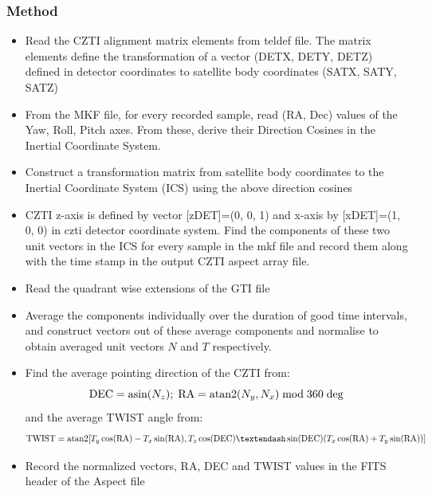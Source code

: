 \documentclass[11pt,oneside,a4paper]{article}
\begin{document}
\subsubsection*{Method}
\begin{itemize}
\item{Read  the  CZTI  alignment  matrix  elements  from  teldef  file. The  matrix  elements  define  the  
transformation  of  a  vector  (DETX,  DETY,  DETZ)  defined  in  detector  coordinates  to  satellite  
body  coordinates  (SATX,  SATY,  SATZ) }

\item{From  the  MKF  file,  for  every  recorded  sample,  
read  (RA,  Dec)  values  of  the  Yaw,  Roll, Pitch  axes.  
From  these,  derive  their  Direction  Cosines  in  the  Inertial  Coordinate  System.}

\item{Construct  
a  transformation  matrix  from  satellite  body  coordinates  to  the  Inertial  Coordinate  
System (ICS) using the above direction cosines}  

\item{CZTI z-axis is defined by vector [zDET]=(0,  0,  1) and x-axis  by [xDET]=(1,  0,  0)
in czti detector coordinate system.  Find  the  components of these two unit 
vectors in  the  ICS for every sample in the mkf file and record them along with the time stamp in   the   output   CZTI   aspect   array   file.
}

\item{Read the quadrant wise extensions of the GTI file}

\item{Average  the  components  individually  over  the  duration  of  good time intervals, and construct
vectors out of these average components and normalise to obtain  averaged unit vectors $N$ and $T$ respectively.}


\item{Find  the  average  pointing  direction  of  the  CZTI from:
$${\rm DEC} =  \mbox{\rm asin}(N_z); \; {\rm RA}  =  \mbox{\rm atan2}(N_y,N_x) \; \mbox{\rm mod} \;  360 \; \mbox{\rm deg} $$
and the  average  TWIST  angle from:
$${\rm TWIST}=\mbox{\rm atan2}[{T_y  \cos({\rm RA})-T_x  \sin({\rm RA})},{T_z  \cos({\rm DEC})–\sin({\rm DEC})(T_x  \cos({\rm RA})+T_y \sin({\rm RA}))}]$$
}

\item{Record  the  normalized  vectors,  
RA,  DEC  and  TWIST  values  in  the  FITS  header  of  the  Aspect file}

\end{itemize}
\end{document}
